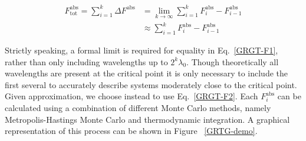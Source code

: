 \documentclass[12pt]{article}
\begin{document}
\begin{align}
    \label{GRGT-F1}
    F^{\text{abs}}_{\text{tot}} = \sum_{i=1}^{k}\Delta F^{\text{abs}} &= \lim_{k\to\infty}\sum_{i=1}^{k} F^{\text{abs}}_{i} - F^{\text{abs}}_{i-1}\\
    &\approx \sum_{i=1}^{k} F^{\text{abs}}_{i} - F^{\text{abs}}_{i-1}
    \label{GRGT-F2}
\end{align}

Strictly speaking, a formal limit is required for equality in Eq.~\ref{GRGT-F1}, rather than only including wavelengths up to $2^k\lambda_0$. Though theoretically all wavelengths are present at the critical point it is only necessary to include the first several to accurately describe systems moderately close to the critical point. Given approximation, we choose instead to use Eq.~\ref{GRGT-F2}. Each $F^{\text{abs}}_i$ can be calculated using a combination of different Monte Carlo methods, namely Metropolis-Hastings Monte Carlo and thermodynamic integration. A graphical representation of this process can be shown in Figure ~\ref{GRTG-demo}.\\

\end{document}
